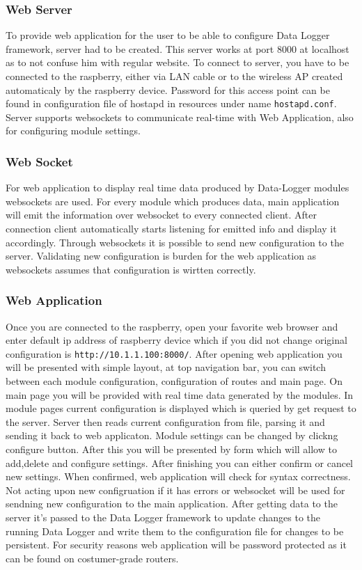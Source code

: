 \subsubsection{Web Server} %
\label{ssub:web_server}
To provide web application for the user to be able to configure Data Logger framework, server had to be created. This server works at port 8000 at localhost as to not confuse him with regular website. To connect to server, you have to be connected to the raspberry, either via LAN cable or to the wireless AP created automaticaly by the raspberry device. Password for this access point can be found in configuration file of hostapd in resources under name \verb|hostapd.conf|. Server supports websockets to communicate real-time with Web Application, also for configuring module settings.
\subsubsection{Web Socket} %
\label{ssub:web_socket}
For web application to display real time data produced by Data-Logger modules websockets are used. For every module which produces data, main application will emit the information over websocket to every connected client. After connection client automatically starts listening for emitted info and display it accordingly. Through websockets it is possible to send new configuration to the server. Validating new configuration is burden for the web application as websockets assumes that configuration is wirtten correctly.
\subsubsection{Web Application} %
\label{ssub:web_application}
Once you are connected to the raspberry, open your favorite web browser and enter default ip address of raspberry device which if you did not change original configuration is \verb|http://10.1.1.100:8000/|. After opening web application you will be presented with simple layout, at top navigation bar, you can switch between each module configuration, configuration of routes and main page. On main page you will be provided with real time data generated by the modules. In module pages current configuration is displayed which is queried by get request to the server. Server then reads current configuration from file, parsing it and sending it back to web applicaton. Module settings can be changed by clickng configure button. After this you will be presented by form which will allow to add,delete and configure settings. After finishing you can either confirm or cancel new settings. When confirmed, web application will check for syntax correctness. Not acting upon new configruation if it has errors or websocket will be used for sendning new configuration to the main application. After getting data to the server it's passed to the Data Logger framework to update changes to the running Data Logger and write them to the configuration file for changes to be persistent. For security reasons web application will be password protected as it can be found on costumer-grade routers.

